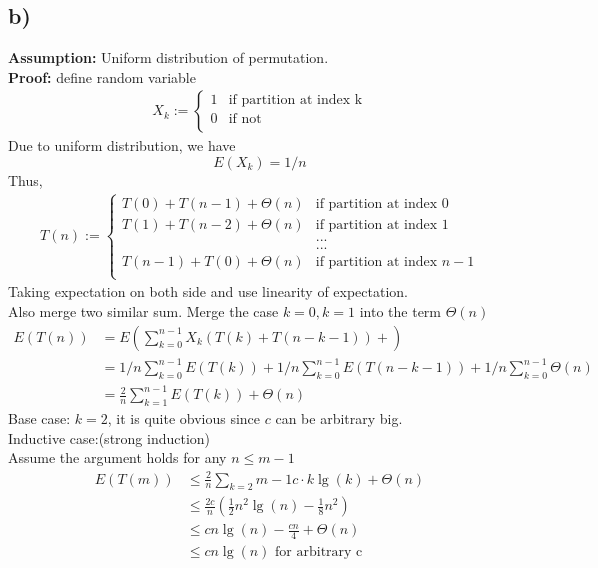 \documentclass{article}
\begin{document}
\subsection*{b)}
\textbf{Assumption:} Uniform distribution of permutation. \\
\textbf{Proof:}
define random variable
\begin{align*}
    X_k :=
    \begin{cases}
        1 & \text{if partition at index k}\\
        0 & \text{if not}\\
    \end{cases}
\end{align*}
Due to uniform distribution, we have
$$ E(X_k) = 1/n $$
Thus,
\begin{align*}
    T(n) :=
    \begin{cases}
        T(0) + T(n - 1) + \Theta(n) & \text{if partition at index 0}\\
        T(1) + T(n - 2) + \Theta(n) & \text{if partition at index 1}\\
        &...\\
        &...\\
        T(n - 1) + T(0) + \Theta(n) & \text{if partition at index } n - 1\\
    \end{cases}
\end{align*}
Taking expectation on both side and use linearity of expectation. \\
Also merge two similar sum. Merge the case $k = 0, k = 1$
into the term $\Theta(n)$
\begin{align*}
    E(T(n)) &=
    E(\sum_{k = 0}^{n - 1} X_k (T(k) + T(n - k - 1)) + ) \\
    &= 1/n \sum_{k = 0}^{n - 1} E(T(k)) +
    1/n  \sum_{k = 0}^{n - 1} E(T(n - k - 1))
    + 1/n  \sum_{k = 0}^{n - 1} \Theta(n) \\
    &= \frac{2}{n} \sum_{k = 1}^{n - 1} E(T(k)) + \Theta(n)
\end{align*}
Base case: $k = 2$, it is quite obvious since $c$ can be arbitrary big. \\
Inductive case:(strong induction) \\
Assume the argument holds for any $n \leq m -1 $
\begin{align*}
    E(T(m)) &\leq \frac{2}{n} \sum_{k = 2}{m - 1} c \cdot k \lg(k) + \Theta(n)\\
    &\leq \frac{2c}{n} (\frac{1}{2} n^2 \lg(n) - \frac{1}{8} n^2)\\
    &\leq c n \lg(n) - \frac{c n}{4} + \Theta(n) \\
    &\leq c n \lg(n) \text{ for arbitrary c}
\end{align*}
\end{document}
